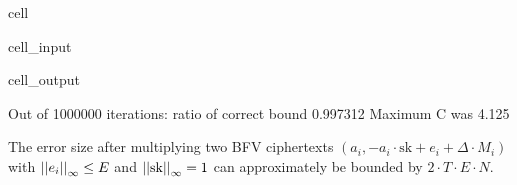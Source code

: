 \documentclass[letterpaper,10pt,english]{jupyterBook}
\begin{document}
\begin{sphinxuseclass}{cell}
\begin{sphinxVerbatimInput}
\begin{sphinxuseclass}{cell_input}
\begin{sphinxVerbatim}[commandchars=\\\{\}]
          
           
\end{sphinxVerbatim}

\end{sphinxuseclass}\end{sphinxVerbatimInput}
\begin{sphinxVerbatimOutput}

\begin{sphinxuseclass}{cell_output}
\begin{sphinxVerbatim}[commandchars=\\\{\}]
Out of 1000000 iterations: ratio of correct bound 0.997312
Maximum C was 4.125
\end{sphinxVerbatim}

\end{sphinxuseclass}\end{sphinxVerbatimOutput}

\end{sphinxuseclass}\label{\detokenize{Thesis:preparations-for-bootstrapping}}
\sphinxAtStartPar
The error size after multiplying two BFV ciphertexts \((a_i,-a_i\cdot \mathrm{sk} + e_i + \Delta\cdot M_i)\) with \(\left\lvert\left\lvert e_i \right\rvert\right\rvert_\infty \le E\) and \(\left\lvert\left\lvert \mathrm{sk} \right\rvert\right\rvert_\infty = 1\) can approximately be bounded by \(2\cdot T\cdot E\cdot N\).

\begin{DUlineblock}{0em}
\item[] 
\end{DUlineblock}

\begin{DUlineblock}{0em}
\item[] 
\end{DUlineblock}
\end{document}
